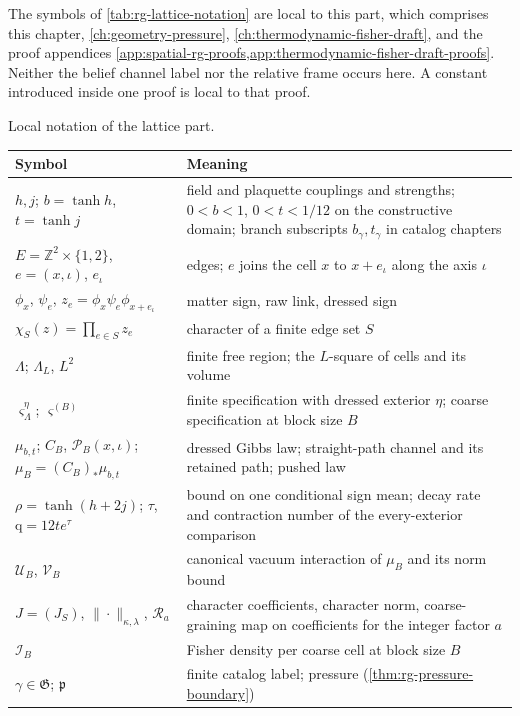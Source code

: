 The symbols of \cref{tab:rg-lattice-notation} are local to this part, which
comprises this chapter, \cref{ch:geometry-pressure},
\cref{ch:thermodynamic-fisher-draft}, and the proof appendices
\cref{app:spatial-rg-proofs,app:thermodynamic-fisher-draft-proofs}. Neither
the belief channel label nor the relative frame occurs here. A constant
introduced inside one proof is local to that proof.

\begin{sciencetable}{Local notation of the lattice part.}
\label{tab:rg-lattice-notation}
\begin{tabularx}{\textwidth}{>{\raggedright\arraybackslash}p{}>{\raggedright\arraybackslash}X}
\toprule
\textbf{Symbol} & \textbf{Meaning} \\
\midrule
\(h,j\); \(b=\tanh h\), \(t=\tanh j\) & field and plaquette couplings and strengths; \(0<b<1\), \(0<t<1/12\) on the constructive domain; branch subscripts \(b_\gamma,t_\gamma\) in catalog chapters \\
\(E=\mathbb Z^2\times\{1,2\}\), \(e=(x,\iota)\), \(e_\iota\) & edges; \(e\) joins the cell \(x\) to \(x+e_\iota\) along the axis \(\iota\) \\
\(\phi_x\), \(\psi_e\), \(z_e=\phi_x\psi_e\phi_{x+e_\iota}\) & matter sign, raw link, dressed sign \\
\(\chi_S(z)=\prod_{e\in S}z_e\) & character of a finite edge set \(S\) \\
\(\Lambda\); \(\Lambda_L\), \(L^2\) & finite free region; the \(L\)-square of cells and its volume \\
\(\varsigma^\eta_\Lambda\); \(\varsigma^{(B)}\) & finite specification with dressed exterior \(\eta\); coarse specification at block size \(B\) \\
\(\mu_{b,t}\); \(C_B\), \(\mathcal P_B(x,\iota)\); \(\mu_B=(C_B)_*\mu_{b,t}\) & dressed Gibbs law; straight-path channel and its retained path; pushed law \\
\(\rho=\tanh(h+2j)\); \(\tau\), \(\mathrm q=12te^\tau\) & bound on one conditional sign mean; decay rate and contraction number of the every-exterior comparison \\
\(\mathscr U_B\), \(\mathcal V_B\) & canonical vacuum interaction of \(\mu_B\) and its norm bound \\
\(J=(J_S)\), \(\|\cdot\|_{\kappa,\lambda}\), \(\mathscr R_a\) & character coefficients, character norm, coarse-graining map on coefficients for the integer factor \(a\) \\
\(\mathcal I_B\) & Fisher density per coarse cell at block size \(B\) \\
\(\gamma\in\mathfrak G\); \(\mathfrak p\) & finite catalog label; pressure (\cref{thm:rg-pressure-boundary}) \\
\bottomrule
\end{tabularx}
\end{sciencetable}

